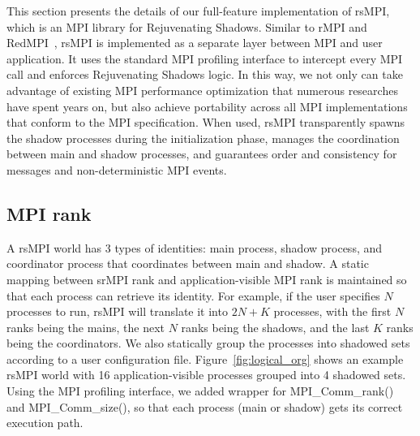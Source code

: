 This section presents the details of our full-feature implementation of rsMPI, which is an MPI library for Rejuvenating Shadows. 
Similar to rMPI and RedMPI~\cite{ferreira_sc_2011,fiala_2012_sdc}, rsMPI is implemented as a separate layer between MPI and user application. It uses the standard MPI profiling interface to intercept every MPI call and enforces Rejuvenating Shadows logic. In this way, we not only can take advantage of existing MPI performance optimization that numerous researches have spent years on, but also achieve portability across all MPI implementations that conform to the MPI specification.
When used, rsMPI transparently spawns the shadow processes during the initialization phase, manages the coordination between main and shadow processes, and guarantees order and consistency for messages and non-deterministic MPI events.

\subsection{MPI rank}
A rsMPI world has 3 types of identities: main process, shadow process, and coordinator process that coordinates between main and shadow. A static mapping between srMPI rank and application-visible MPI rank is maintained so that each process can retrieve its identity. For example, if the user specifies $N$ processes to run, rsMPI will translate it into $2N + K$ processes, %
with the first $N$ ranks being the mains, the next $N$ ranks being the shadows, and the last $K$ ranks being the coordinators. 
We also statically group the processes into shadowed sets according to a user configuration file. Figure~\ref{fig:logical_org} shows an example rsMPI world with 16 application-visible processes grouped into 4 shadowed sets. Using the MPI profiling interface, we added wrapper for MPI\_Comm\_rank() and MPI\_Comm\_size(), so that each process (main or shadow) gets its correct execution path.

